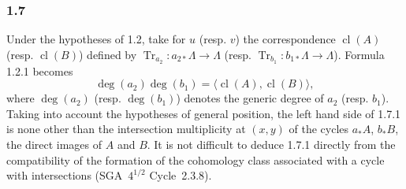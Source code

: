 \documentclass[11pt]{article}
\providecommand{\cl}{\operatorname{cl}}
\providecommand{\Tr}{\operatorname{Tr}}
\begin{document}
\subsubsection*{1.7}
Under the hypotheses of 1.2, take for $u$ (resp. $v$) the correspondence $\cl(A)$ (resp. $\cl(B)$) defined by $\Tr_{a_2}:a_{2*}\Lambda\to\Lambda$ (resp. $\Tr_{b_1}:b_{1*}\Lambda\to\Lambda$). Formula 1.2.1 becomes
\begin{equation}\tag{1.7.1}
\deg(a_2)\deg(b_1)=\langle \cl(A),\cl(B)\rangle,
\end{equation}
where $\deg(a_2)$ (resp. $\deg(b_1)$) denotes the generic degree of $a_2$ (resp. $b_1$). Taking into account the hypotheses of general position, the left hand side of 1.7.1 is none other than the intersection multiplicity at $(x,y)$ of the cycles $a_*A$, $b_*B$, the direct images of $A$ and $B$. It is not difficult to deduce 1.7.1 directly from the compatibility of the formation of the cohomology class associated with a cycle with intersections (SGA~$4^{1/2}$ Cycle~2.3.8).
\end{document}
